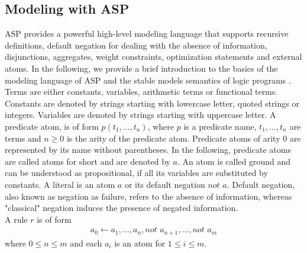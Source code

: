 \documentclass{easychair}
\newcommand{\ASP}{ASP}
\newcommand{\naf}{\textit{not }}
\begin{document}
\subsection{Modeling with \ASP{}}
\label{subsec:asp}
  \ASP{} provides a powerful high-level modeling language that supports recursive definitions, default negation for dealing with the absence of information, disjunctions, aggregates, weight constraints, optimization statements and external atoms. 
  In the following, we provide a brief introduction to the basics of the modeling language of \ASP{} \cite{cafageiakakrlemarisc19a} and the stable models semantics of logic programs \cite{gellif88b}. \\
  Terms are either constants, variables, arithmetic terms or functional terms. 
  Constants are denoted by strings starting with lowercase letter, quoted strings or integers. 
  Variables are denoted by strings starting with uppercase letter. 
  A predicate atom, is of form $p(t_1,\dots,t_n)$, where $p$ is a predicate name, $t_1,\dots,t_n$ are terms and $n\geq0$ is the arity of the predicate atom. 
  Predicate atoms of arity $0$ are represented by its name without parentheses.
  In the following, predicate atoms are called atoms for short and are denoted by $a$.
  An atom is called ground and can be understood as propositional, if all its variables are substituted by constants. 
  A literal is an atom $a$ or its default negation $\naf{} a$. 
  Default negation, also known as negation as failure, refers to the absence of information, whereas "classical" negation induces the presence of negated information. \\
  A rule $r$ is of form 
  \begin{align*}
    a_0 \leftarrow a_1,\dots,a_n, \naf{} a_{n+1},\dots,\naf{} a_m
  \end{align*}
  where $0\leq n\leq m$ and each $a_i$ is an atom for $1\leq i \leq m$. 
\end{document}
